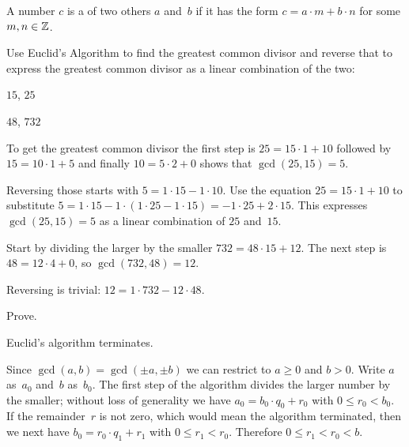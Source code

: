\documentclass{ibl}  %
\begin{document}
\begin{bezoutproof}
\begin{df}
A number $c$ is a  of two others $a$ and~$b$
if it has the form $c=a\cdot m+b\cdot n$ for some $m,n\in\mathbb{Z}$.  
\end{df}

\begin{problem}
Use Euclid's Algorithm to find the greatest common divisor and 
reverse that to express the greatest common divisor as a 
linear combination of the two:
\begin{items}
\item $15$, $25$
\item $48$, $732$
\end{items}
\begin{answer}
\begin{items}
\item To get the greatest common divisor the first step is
  $25=15\cdot 1+10$ followed by $15=10\cdot 1+5$ and finally
  $10=5\cdot 2+0$ shows that $\gcd(25,15)=5$.

  Reversing those starts with $5=1\cdot 15-1\cdot 10$.
  Use the equation $25=15\cdot 1+10$ to substitute 
  $5=1\cdot 15-1\cdot(1\cdot 25-1\cdot 15)=-1\cdot 25+2\cdot 15$.
  This expresses $\gcd(25,15)=5$ as a linear combination of
  $25$ and~$15$.
\item Start by dividing the larger by the smaller
  $732=48\cdot 15+12$.
  The next step is $48=12\cdot 4+0$, so $\gcd(732,48)=12$.

  Reversing is trivial:
  $12=1\cdot 732-12\cdot 48$.
\end{items}
\end{answer}
\end{problem}

\begin{problem} Prove.  \label{ex:Bezout}
\begin{exes}
\begin{exercise} 
  Euclid's algorithm terminates.
\end{exercise}
\begin{answer}
  Since $\gcd(a,b)=\gcd(\pm a, \pm b)$ we can restrict to $a\geq 0$
  and $b>0$.
  Write $a$ as~$a_0$ and~$b$ as~$b_0$.
  The first step of the algorithm divides the larger number by the smaller; 
  without loss of generality we have $a_0=b_0\cdot q_0+r_0$ with 
  $0\leq r_0< b_0$.
  If the remainder~$r$ is not zero, which would mean the algorithm 
  terminated,
  then we next have $b_0=r_0\cdot q_1+r_1$ with $0\leq r_1< r_0$.
  Therefore $0\leq r_1<r_0<b$.


\end{answer}
\end{exes}
\end{problem}
\end{bezoutproof}
\end{document}

